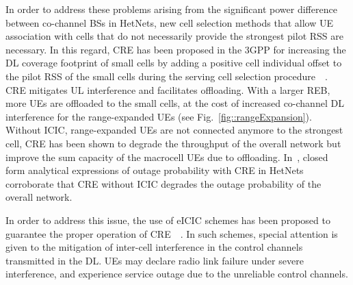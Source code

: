 \documentclass{IEEEtran}
\begin{document}
In order to address these problems arising from the significant power difference between co-channel \acp{BS} in \acp{HetNet},
new cell selection methods that allow \ac{UE} association with cells that do not necessarily provide the strongest pilot \ac{RSS} are necessary.
In this regard,
\ac{CRE} has been proposed in the \ac{3GPP} for increasing the \ac{DL} coverage footprint of small cells
by adding a positive cell individual offset to the pilot \ac{RSS} of the small cells during the serving cell selection procedure~\cite{R1-100701_Qualcomm}~\cite{6166483}. \ac{CRE} mitigates UL interference and facilitates offloading.
With a larger \ac{REB},
more \acp{UE} are offloaded to the small cells,
at the cost of increased co-channel \ac{DL} interference for the range-expanded \acp{UE} (see Fig.~\ref{fig::rangeExpansion}).
Without \ac{ICIC},
range-expanded \acp{UE} are not connected anymore to the strongest cell,
\ac{CRE} has been shown to degrade the throughput of the overall network but improve the sum capacity of the macrocell \acp{UE} due to offloading.
In~\cite{Andrews_Globecom2011_RE}, closed form analytical expressions of outage probability with \ac{CRE} in \acp{HetNet} corroborate that
\ac{CRE} without \ac{ICIC} degrades the outage probability of the overall network.

In order to address this issue,
the use of \ac{eICIC} schemes has been proposed to guarantee the proper operation of \ac{CRE}~\cite{5876496}~\cite{Lopez_perez2011HetNet}. In such schemes,
special attention is given to the mitigation of inter-cell interference in the control channels transmitted in the \ac{DL}.
\acp{UE} may declare radio link failure under severe interference,
and experience service outage due to the unreliable control channels.
\end{document}
